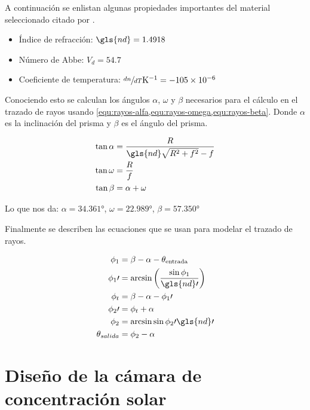 		A continuación se enlistan algunas propiedades importantes del material seleccionado \cite{shannon_art_1997} citado por \cite{leutz_nonimaging_2001}.
		
		\begin{itemize}
			\item Índice de refracción: $\gls{nd} = 1.4918$
			\item Número de Abbe: $V_d = 54.7$
			\item Coeficiente de temperatura: $\sfrac{dn}{dT} \unit{\per\kelvin} = \num{-105e-6}$
		\end{itemize}
		
		Conociendo esto se calculan los ángulos $\alpha$, $\omega$ y $\beta$ necesarios para el cálculo en el trazado de rayos usando \cref{equ:rayos-alfa,equ:rayos-omega,equ:rayos-beta}. Donde $\alpha$ es la inclinación del prisma y $\beta$ es el ángulo del prisma.
		
		\begin{align}
			\tan\alpha &= \dfrac{R}{\gls{nd}\sqrt{R^{2}+f^{2}} - f} \label{equ:rayos-alfa}\\
			\tan\omega &= \dfrac{R}{f} \label{equ:rayos-omega}\\
			\tan\beta &= \alpha + \omega \label{equ:rayos-beta}
		\end{align}
		
		Lo que nos da: $\alpha= \ang{34.361}$, $\omega = \ang{22.989}$, $\beta= \ang{57.350}$
		
		Finalmente se describen las ecuaciones que se usan para modelar el trazado de rayos.
		
		\begin{align}
			\phi_{1} &= \beta - \alpha - \theta_{\text{entrada}}\\
			\phi_{1}\prime &= \arcsin\left(\dfrac{\sin\phi_{1}}{\gls{nd}\prime}\right)\\
			\phi_{t} &= \beta - \alpha - \phi_{1}\prime\\
			\phi_{2}\prime &= \phi_{t} + \alpha\\
			\phi_{2} &= \arcsin{\sin\phi_{2}\prime\gls{nd}\prime}\\
			\theta_{salida} &= \phi_{2} - \alpha
		\end{align}
		
		
	
	\section{Diseño de la cámara de concentración solar}
		
